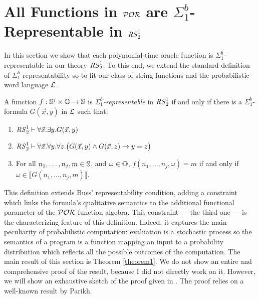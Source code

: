 
\section{All Functions in $\mathcal{POR}$ are $\Sigma^b_1$-Representable in ${\mathit{RS}^1_2}$}
\label{sec:TaskA}


In this section we show that each polynomial-time oracle function
is $\Sigma^b_1$-representable in our theory ${\mathit{RS}^1_2}$.
%
To this end, we extend the standard definition
of $\Sigma^b_1$-representability
so to fit our class of string functions
and the probabilistic word language $\mathcal{L}$.



\begin{defn}\label{df:representability}
A function $f:\mathbb{S}^j \times \mathbb{O} \rightarrow
\mathbb{S}$ is \emph{$\Sigma^b_1$-representable} in
${\mathit{RS}^1_2}$ if and only if there is
a $\Sigma^b_1$-formula
$G(\vec{x},y)$ in $\mathcal{L}$ such that:
\begin{enumerate}
\itemsep0em
\item ${\mathit{RS}^1_2}\vdash\forall\vec{x}.\exists y.G(\vec{x},y)$
\item ${\mathit{RS}^1_2}\vdash \forall \vec{x}.\forall y.\forall z.
\big(G(\vec{x},y)\wedge
G(\vec{x},z) \rightarrow y=z\big)$
\item For all $n_1,\dots, n_j,m\in \mathbb{S}$,
and $\omega \in \mathbb{O}$,
$f(n_1,\dots, n_j,\omega)=m$
if and only if $\omega\in\llbracket G({n_1},
\dots, {n_j},{m})\rrbracket$.
\end{enumerate}
\end{defn}

This definition extends Buss' representability condition,
adding a constraint which links the formula's
qualitative semantics to the additional functional parameter of the $\mathcal{POR}$ function algebra.
%
This constraint --- the third one --- is the characterizing feature of this definition. Indeed, it captures the main peculiarity of probabilistic computation: evaluation is a stochastic process so the semantics of a program is a function mapping an input to a probability distribution which reflects all the possible outcomes of the computation.
%
The main result of this section is Theorem \ref{theorem1}. We do not show an entire and comprehensive proof of the result, because I did not directly work on it. However, we will show an exhaustive sketch of the proof given in \cite{RBA}.
%
The proof relies on a
well-known result by Parikh.

